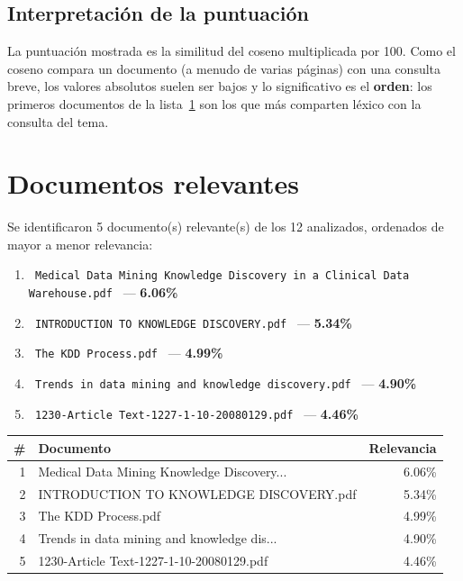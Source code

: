 \documentclass[11pt,a4paper]{article}
\newcommand{\nombrearchivo}[1]{\texttt{#1}}
\newcommand{\pcento}{\%}
\begin{document}
\subsection{Interpretación de la puntuación}

La puntuación mostrada es la similitud del coseno multiplicada por 100. Como
el coseno compara un documento (a menudo de varias páginas) con una consulta
breve, los valores absolutos suelen ser bajos y lo significativo es el
\textbf{orden}: los primeros documentos de la lista~\ref{sec:relevantes} son
los que más comparten léxico con la consulta del tema.

\section{Documentos relevantes}
\label{sec:relevantes}

Se identificaron 5 documento(s) relevante(s) de los
12 analizados, ordenados de mayor a menor relevancia:

\begin{enumerate}
\setlength{\itemsep}{6pt}
\renewcommand{\labelenumi}{\arabic{enumi}.}
  \item \nombrearchivo{ Medical Data Mining Knowledge Discovery in a Clinical Data Warehouse.pdf } --- \textbf{ 6.06\pcento}
  \item \nombrearchivo{ INTRODUCTION TO KNOWLEDGE DISCOVERY.pdf } --- \textbf{ 5.34\pcento}
  \item \nombrearchivo{ The KDD Process.pdf } --- \textbf{ 4.99\pcento}
  \item \nombrearchivo{ Trends in data mining and knowledge discovery.pdf } --- \textbf{ 4.90\pcento}
  \item \nombrearchivo{ 1230-Article Text-1227-1-10-20080129.pdf } --- \textbf{ 4.46\pcento}
\end{enumerate}

\begin{center}
\begin{tabular}{r p{8.5cm} r}
\hline
\textbf{\#} & \textbf{Documento} & \textbf{Relevancia} \\
\hline
1 & Medical Data Mining Knowledge Discovery... & 6.06\pcento \\
2 & INTRODUCTION TO KNOWLEDGE DISCOVERY.pdf & 5.34\pcento \\
3 & The KDD Process.pdf & 4.99\pcento \\
4 & Trends in data mining and knowledge dis... & 4.90\pcento \\
5 & 1230-Article Text-1227-1-10-20080129.pdf & 4.46\pcento \\
\hline
\end{tabular}
\end{center}
\end{document}
